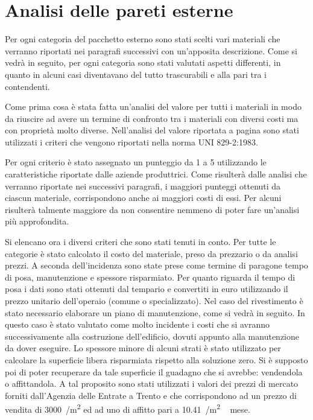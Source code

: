 \chapter{Analisi delle pareti esterne}\label{par:due}
Per ogni categoria del pacchetto esterno sono stati scelti vari materiali che verranno riportati nei paragrafi successivi con un'apposita descrizione.  
Come si vedrà in seguito, per ogni categoria sono stati valutati aspetti differenti, in quanto in alcuni casi diventavano del tutto trascurabili e alla pari tra i contendenti.

Come prima cosa è stata fatta un'analisi del valore per tutti i materiali in modo da riuscire ad avere un termine di confronto tra i materiali con diversi costi ma con proprietà molto diverse. 
Nell'analisi del valore riportata a pagina \pageref{fig:AnalisiValore} sono stati utilizzati i criteri che vengono riportati nella norma \textsc{UNI 829-2:1983}.

Per ogni criterio è stato assegnato un punteggio da 1 a 5 utilizzando le caratteristiche riportate dalle aziende produttrici. 
Come risulterà dalle analisi che verranno riportate nei successivi paragrafi, i maggiori punteggi ottenuti da ciascun materiale, corrispondono anche ai maggiori costi di essi.
Per alcuni risulterà talmente maggiore da non consentire nemmeno di poter fare un'analisi più approfondita.

Si elencano ora i diversi criteri che sono stati tenuti in conto.
Per tutte le categorie è stato calcolato il costo del materiale, preso da prezzario o da analisi prezzi.
A seconda dell'incidenza sono state prese come termine di paragone tempo di posa, manutenzione e spessore risparmiato.
Per quanto riguarda il tempo di posa i dati sono stati ottenuti dal tempario \textcite{grosso2007tempario} e convertiti in euro utilizzando il prezzo unitario dell'operaio (comune o specializzato). 
Nel caso del rivestimento è stato necessario elaborare un piano di manutenzione, come si vedrà in seguito. 
In questo caso è stato valutato come molto incidente i costi che si avranno successivamente alla costruzione dell'edificio, dovuti appunto alla manutenzione da dover eseguire.
Lo spessore minore di alcuni strati è stato utilizzato per calcolare la superficie libera risparmiata rispetto alla soluzione zero. 
Si è supposto poi di poter recuperare da tale superficie il guadagno che si avrebbe: vendendola o affittandola.
A tal proposito sono stati utilizzati i valori dei prezzi di mercato forniti dall'Agenzia delle Entrate a Trento e che corrispondono ad un  prezzo di vendita di \SI{3000}{\teuro / \square\metre} ed ad uno di affitto pari a \SI{10.41}{\teuro /\square\metre\, mese}.